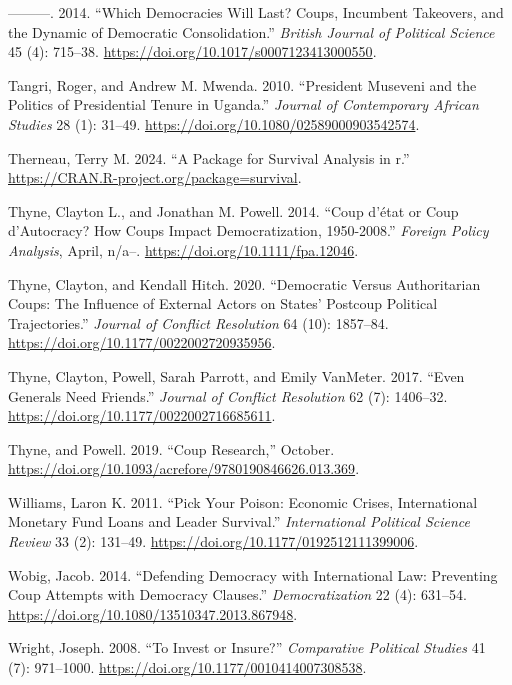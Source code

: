 \documentclass[
  12pt,
]{report}
\newlength{\cslhangindent}
\newenvironment{CSLReferences}[2] %
 {\begin{list}{}{%
  \setlength{\itemindent}{0pt}
  \setlength{\leftmargin}{0pt}
  \setlength{\parsep}{0pt}
  \ifodd #1
   \setlength{\leftmargin}{\cslhangindent}
   \setlength{\itemindent}{-1\cslhangindent}
  \fi
  \setlength{\itemsep}{#2\baselineskip}}}
 {\end{list}}
\begin{document}
\begin{CSLReferences}{1}{0}
---------. 2014. {``Which Democracies Will Last? Coups, Incumbent
Takeovers, and the Dynamic of Democratic Consolidation.''} \emph{British
Journal of Political Science} 45 (4): 715--38.
\url{https://doi.org/10.1017/s0007123413000550}.

Tangri, Roger, and Andrew M. Mwenda. 2010. {``President Museveni and the
Politics of Presidential Tenure in Uganda.''} \emph{Journal of
Contemporary African Studies} 28 (1): 31--49.
\url{https://doi.org/10.1080/02589000903542574}.

Therneau, Terry M. 2024. {``A Package for Survival Analysis in r.''}
\url{https://CRAN.R-project.org/package=survival}.

Thyne, Clayton L., and Jonathan M. Powell. 2014. {``Coup d{'}état or
Coup d'Autocracy? How Coups Impact Democratization, 1950-2008.''}
\emph{Foreign Policy Analysis}, April, n/a--.
\url{https://doi.org/10.1111/fpa.12046}.

Thyne, Clayton, and Kendall Hitch. 2020. {``Democratic Versus
Authoritarian Coups: The Influence of External Actors on States{'}
Postcoup Political Trajectories.''} \emph{Journal of Conflict
Resolution} 64 (10): 1857--84.
\url{https://doi.org/10.1177/0022002720935956}.

Thyne, Clayton, Powell, Sarah Parrott, and Emily VanMeter. 2017. {``Even
Generals Need Friends.''} \emph{Journal of Conflict Resolution} 62 (7):
1406--32. \url{https://doi.org/10.1177/0022002716685611}.

Thyne, and Powell. 2019. {``Coup Research,''} October.
\url{https://doi.org/10.1093/acrefore/9780190846626.013.369}.

Williams, Laron K. 2011. {``Pick Your Poison: Economic Crises,
International Monetary Fund Loans and Leader Survival.''}
\emph{International Political Science Review} 33 (2): 131--49.
\url{https://doi.org/10.1177/0192512111399006}.

Wobig, Jacob. 2014. {``Defending Democracy with International Law:
Preventing Coup Attempts with Democracy Clauses.''}
\emph{Democratization} 22 (4): 631--54.
\url{https://doi.org/10.1080/13510347.2013.867948}.

Wright, Joseph. 2008. {``To Invest or Insure?''} \emph{Comparative
Political Studies} 41 (7): 971--1000.
\url{https://doi.org/10.1177/0010414007308538}.


\end{CSLReferences}
\end{document}
